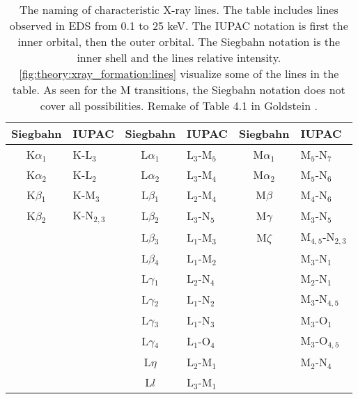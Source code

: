 \begin{table}[p]
    \centering
    \caption{
        The naming of characteristic X-ray lines.
        The table includes lines observed in EDS from 0.1 to 25 keV.
        The IUPAC notation is first the inner orbital, then the outer orbital.
        The Siegbahn notation is the inner shell and the lines relative intensity.
        \cref{fig:theory:xray_formation:lines} visualize some of the lines in the table.
        As seen for the M transitions, the Siegbahn notation does not cover all possibilities.
        Remake of Table 4.1 in Goldstein \cite{goldstein_scanning_2018}.
    }
    \label{tab:theory:naming_convention}
    \begin{tabular}{cl||cl||cl}
        Siegbahn      & IUPAC       & Siegbahn      & IUPAC       & Siegbahn      & IUPAC               \\
        \hline
        K$\alpha$$_1$ & K-L$_3$     & L$\alpha$$_1$ & L$_3$-M$_5$ & M$\alpha$$_1$ & M$_5$-N$_7$         \\
        K$\alpha$$_2$ & K-L$_2$     & L$\alpha$$_2$ & L$_3$-M$_4$ & M$\alpha$$_2$ & M$_5$-N$_6$         \\
        K$\beta$$_1$  & K-M$_3$     & L$\beta$$_1$  & L$_2$-M$_4$ & M$\beta$      & M$_4$-N$_6$         \\
        K$\beta$$_2$  & K-N$_{2,3}$ & L$\beta$$_2$  & L$_3$-N$_5$ & M$\gamma$     & M$_3$-N$_5$         \\
                      &             & L$\beta$$_3$  & L$_1$-M$_3$ & M$\zeta$      & M$_{4,5}$-N$_{2,3}$ \\
                      &             & L$\beta$$_4$  & L$_1$-M$_2$ &               & M$_3$-N$_1$         \\
                      &             & L$\gamma$$_1$ & L$_2$-N$_4$ &               & M$_2$-N$_1$         \\
                      &             & L$\gamma$$_2$ & L$_1$-N$_2$ &               & M$_3$-N$_{4,5}$     \\
                      &             & L$\gamma$$_3$ & L$_1$-N$_3$ &               & M$_3$-O$_1$         \\
                      &             & L$\gamma$$_4$ & L$_1$-O$_4$ &               & M$_3$-O$_{4,5}$     \\
                      &             & L$\eta$       & L$_2$-M$_1$ &               & M$_2$-N$_4$         \\
                      &             & L$l$          & L$_3$-M$_1$ &               &
    \end{tabular}
\end{table}